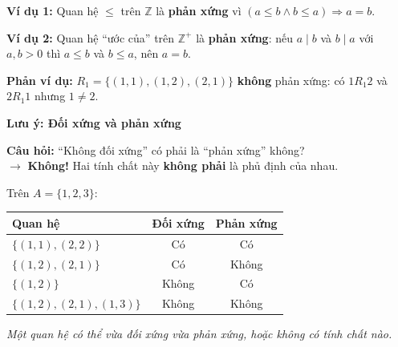 \documentclass[12pt,a4paper]{article}
\begin{document}
\noindent
\begin{minipage}[t]{0.58\textwidth}
\textbf{\textcolor{AccentRed}{Ví dụ 1:}} Quan hệ $\le$ trên $\mathbb{Z}$ là \textbf{phản xứng} vì $(a \le b \land b \le a) \Rightarrow a = b$.

\textbf{\textcolor{AccentRed}{Ví dụ 2:}} Quan hệ ``ước của'' trên $\mathbb{Z}^+$ là \textbf{phản xứng}: nếu $a \mid b$ và $b \mid a$ với $a, b > 0$ thì $a \le b$ và $b \le a$, nên $a = b$.

\textbf{Phản ví dụ:} $R_1 = \{(1,1), (1,2), (2,1)\}$ \textbf{không} phản xứng: có $1 R_1 2$ và $2 R_1 1$ nhưng $1 \neq 2$.
\end{minipage}
\hfill
\begin{minipage}[t]{0.38\textwidth}
\centering
\vspace{0pt}
\end{minipage}

\vspace{6pt}
\textbf{Lưu ý: Đối xứng và phản xứng}

\textbf{Câu hỏi:} ``Không đối xứng'' có phải là ``phản xứng'' không?\\
$\rightarrow$ \textbf{Không!} Hai tính chất này \textbf{không phải} là phủ định của nhau.

Trên $A = \{1, 2, 3\}$:
\begin{center}
\renewcommand{\arraystretch}{1.2}
\begin{tabular}{lcc}
\toprule
\textbf{Quan hệ} & \textbf{Đối xứng} & \textbf{Phản xứng} \\
\midrule
$\{(1, 1), (2, 2)\}$ & Có & Có \\
$\{(1, 2), (2, 1)\}$ & Có & Không \\
$\{(1, 2)\}$ & Không & Có \\
$\{(1, 2), (2, 1), (1, 3)\}$ & Không & Không \\
\bottomrule
\end{tabular}
\end{center}
\textit{Một quan hệ có thể vừa đối xứng vừa phản xứng, hoặc không có tính chất nào.}
\end{document}

